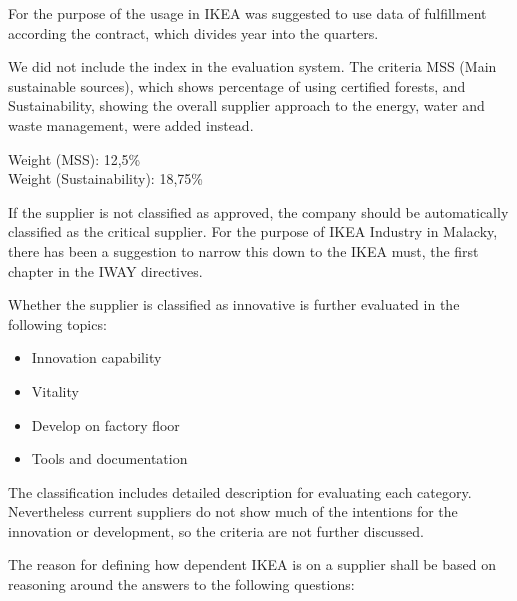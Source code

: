 \documentclass[oneside,12pt]{article}%
\begin{document}
For the purpose of the usage in IKEA was suggested to use data of fulfillment according the contract, which divides year into the quarters.

We did not include the index in the evaluation system. The criteria MSS (Main sustainable sources), which shows percentage of using certified forests, and Sustainability, showing the overall supplier approach to the energy, water and waste management, were added instead. \par

\vspace{2mm}
\noindent Weight (MSS): 12,5\% \\
Weight (Sustainability): 18,75\%
\vspace{2mm}\par

If the supplier is not classified as approved, the company should be automatically classified as the critical supplier. For the purpose of IKEA Industry in Malacky, there has been a suggestion to narrow this down to the IKEA must, the first chapter in the IWAY directives.


Whether the supplier is classified as innovative is further evaluated in the following topics:
\begin{itemize}
  \item Innovation capability
  \item Vitality
  \item Develop on factory floor
  \item Tools and documentation
\end{itemize}
The classification includes detailed description for evaluating each category. Nevertheless current suppliers do not show much of the intentions for the innovation or development, so the criteria are not further discussed.


The reason for defining how dependent IKEA is on a supplier shall be based on reasoning around the answers to the following questions:
\end{document}
